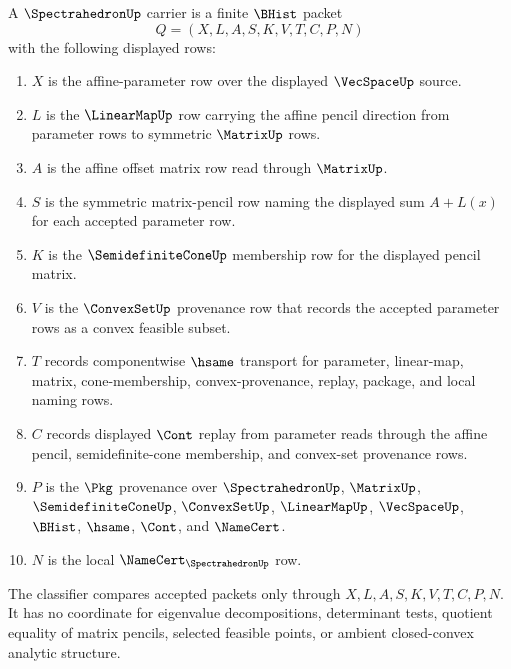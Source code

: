 \begin{definition}
\label{def:spectrahedron-carrier}
A $\SpectrahedronUp$ carrier is a finite $\BHist$ packet
$$
Q=(X,L,A,S,K,V,T,C,P,N)
$$
with the following displayed rows:
\begin{enumerate}
\item $X$ is the affine-parameter row over the displayed $\VecSpaceUp$ source.
\item $L$ is the $\LinearMapUp$ row carrying the affine pencil direction from parameter rows to symmetric $\MatrixUp$ rows.
\item $A$ is the affine offset matrix row read through $\MatrixUp$.
\item $S$ is the symmetric matrix-pencil row naming the displayed sum $A+L(x)$ for each accepted parameter row.
\item $K$ is the $\SemidefiniteConeUp$ membership row for the displayed pencil matrix.
\item $V$ is the $\ConvexSetUp$ provenance row that records the accepted parameter rows as a convex feasible subset.
\item $T$ records componentwise $\hsame$ transport for parameter, linear-map, matrix, cone-membership, convex-provenance, replay, package, and local naming rows.
\item $C$ records displayed $\Cont$ replay from parameter reads through the affine pencil, semidefinite-cone membership, and convex-set provenance rows.
\item $P$ is the $\Pkg$ provenance over $\SpectrahedronUp$, $\MatrixUp$, $\SemidefiniteConeUp$, $\ConvexSetUp$, $\LinearMapUp$, $\VecSpaceUp$, $\BHist$, $\hsame$, $\Cont$, and $\NameCert$.
\item $N$ is the local $\NameCert_{\SpectrahedronUp}$ row.
\end{enumerate}
The classifier compares accepted packets only through $X,L,A,S,K,V,T,C,P,N$. It has no coordinate for eigenvalue decompositions, determinant tests, quotient equality of matrix pencils, selected feasible points, or ambient closed-convex analytic structure.
\end{definition}

